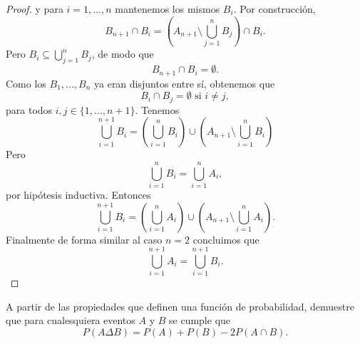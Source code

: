\documentclass[12pt,a4paper]{article}
\begin{document}
\begin{proof}
        y para $i=1,\dots,n$ mantenemos los mismos $B_{i}$. Por construcción,
        \begin{equation*}
            B_{n+1}\cap B_{i}=\left(A_{n+1}\setminus\bigcup_{j=1}^{n}B_{j}\right)\cap B_{i}.
        \end{equation*}
        Pero $B_{i}\subseteq\bigcup_{j=1}^{n}B_{j}$, de modo que
        \begin{equation*}
            B_{n+1}\cap B_{i}=\emptyset.
        \end{equation*}
        Como los $B_{1},\dots,B_{n}$ ya eran disjuntos entre sí, obtenemos que
        \begin{equation*}
            B_{i}\cap B_{j}=\emptyset\text{ si }i\neq j,
        \end{equation*}
        para todos $i,j\in\{1,\dots,n+1\}$. Tenemos
        \begin{equation*}
            \bigcup_{i=1}^{n+1}B_{i}=\left(\bigcup_{i=1}^{n}B_{i}\right)\cup\left(A_{n+1}\setminus\bigcup_{i=1}^{n}B_{i}\right)
        \end{equation*}
        Pero
        \begin{equation*}
            \bigcup_{i=1}^{n}B_{i}=\bigcup_{i=1}^{n}A_{i},
        \end{equation*}
        por hipótesis inductiva. Entonces
        \begin{equation*}
            \bigcup_{i=1}^{n+1}B_{i}=\left(\bigcup_{i=1}^{n}A_{i}\right)\cup\left(A_{n+1}\setminus\bigcup_{i=1}^{n}A_{i}\right).
        \end{equation*}
        Finalmente de forma similar al caso $n=2$ concluimos que
        \begin{equation*}
            \bigcup_{i=1}^{n+1}A_{i}=\bigcup_{i=1}^{n+1}B_{i}.
        \end{equation*}
    \end{proof}

    \begin{mdframed}[style=mdbluebox,frametitle={Ejercicio 2}]
        A partir de las propiedades que definen una función de probabilidad, demuestre que para cualesquiera eventos $A$ y $B$ se cumple que
        \[
            P(A \Delta B) = P(A) + P(B) - 2P(A \cap B).
        \]
    \end{mdframed}
\end{document}
